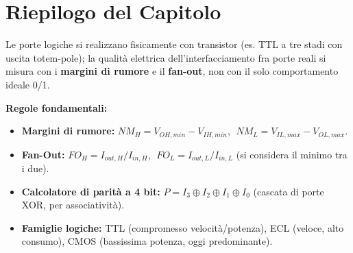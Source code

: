 \section*{Riepilogo del Capitolo}

\begin{important}
Le porte logiche si realizzano fisicamente con transistor (es. TTL a tre stadi con uscita totem-pole); la qualità elettrica dell'interfacciamento fra porte reali si misura con i \textbf{margini di rumore} e il \textbf{fan-out}, non con il solo comportamento ideale 0/1.
\end{important}

\begin{note}
\textbf{Regole fondamentali:}
\begin{itemize}
    \item \textbf{Margini di rumore:} $NM_H = V_{OH,min}-V_{IH,min}$, $\; NM_L = V_{IL,max}-V_{OL,max}$.
    \item \textbf{Fan-Out:} $FO_H = I_{out,H}/I_{in,H}$, $\; FO_L = I_{out,L}/I_{in,L}$ (si considera il minimo tra i due).
    \item \textbf{Calcolatore di parità a 4 bit:} $P = I_3 \oplus I_2 \oplus I_1 \oplus I_0$ (cascata di porte XOR, per associatività).
    \item \textbf{Famiglie logiche:} TTL (compromesso velocità/potenza), ECL (veloce, alto consumo), CMOS (bassissima potenza, oggi predominante).
\end{itemize}
\end{note}

